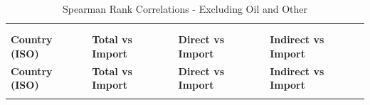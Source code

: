 \begin{longtable}{p{5cm}p{3cm}p{3cm}p{5cm}}
\centering
\caption{Spearman Rank Correlations - Excluding Oil and Other} \\
\label{tab:Spearman_Rank_Correlations__Excluding_Oil_and_Other} \\
\toprule
\textbf{Country (ISO)} & \textbf{Total vs Import} & \textbf{Direct vs Import} & \textbf{Indirect vs Import} \\
\midrule
\endfirsthead

\toprule
\textbf{Country (ISO)} & \textbf{Total vs Import} & \textbf{Direct vs Import} & \textbf{Indirect vs Import} \\
\midrule
\endhead

\bottomrule
\endfoot

\bottomrule
\endlastfoot


\end{longtable}

